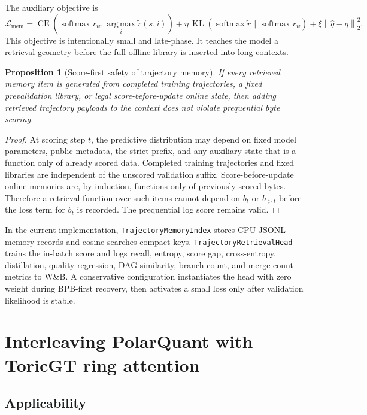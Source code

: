 \documentclass[11pt]{article}
\theoremstyle{definition}
\theoremstyle{plain}
\newtheorem{proposition}[definition]{Proposition}
\theoremstyle{remark}
\numberwithin{equation}{section}
\newcommand{\softmax}{\operatorname{softmax}}
\newcommand{\argmax}{\operatorname*{arg\,max}}
\newcommand{\norm}[1]{\left\lVert #1\right\rVert}
\begin{document}
The auxiliary objective is
\begin{equation}
  \mathcal L_{\mathrm{mem}}
  =\operatorname{CE}\left(\softmax r_\psi,\argmax_i\widetilde r(s,i)\right)
  +\eta\,\operatorname{KL}\left(\softmax\widetilde r\;\Vert\;\softmax r_\psi\right)
  +\xi\norm{\widehat q-q}_2^2.
\end{equation}
This objective is intentionally small and late-phase.  It teaches the model a retrieval geometry before the full offline library is inserted into long contexts.

\begin{proposition}[Score-first safety of trajectory memory]
If every retrieved memory item is generated from completed training trajectories, a fixed prevalidation library, or legal score-before-update online state, then adding retrieved trajectory payloads to the context does not violate prequential byte scoring.
\end{proposition}

\begin{proof}
At scoring step $t$, the predictive distribution may depend on fixed model parameters, public metadata, the strict prefix, and any auxiliary state that is a function only of already scored data.  Completed training trajectories and fixed libraries are independent of the unscored validation suffix.  Score-before-update online memories are, by induction, functions only of previously scored bytes.  Therefore a retrieval function over such items cannot depend on $b_t$ or $b_{>t}$ before the loss term for $b_t$ is recorded.  The prequential log score remains valid.
\end{proof}

In the current implementation, \texttt{TrajectoryMemoryIndex} stores CPU JSONL memory records and cosine-searches compact keys.  \texttt{TrajectoryRetrievalHead} trains the in-batch score and logs recall, entropy, score gap, cross-entropy, distillation, quality-regression, DAG similarity, branch count, and merge count metrics to W\&B.  A conservative configuration instantiates the head with zero weight during BPB-first recovery, then activates a small loss only after validation likelihood is stable.

\section{Interleaving PolarQuant with ToricGT ring attention}

\subsection{Applicability}
\end{document}
